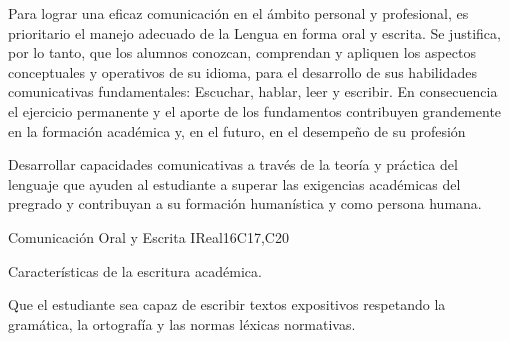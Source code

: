 \begin{syllabus}


\begin{justification}
Para lograr una eficaz comunicación en el ámbito personal y profesional, es prioritario el manejo adecuado de la Lengua en forma oral y escrita. Se justifica, por lo tanto, que los alumnos  conozcan, comprendan y apliquen los aspectos conceptuales y operativos de su idioma, para el desarrollo de sus habilidades comunicativas fundamentales: Escuchar, hablar, leer y escribir.
En consecuencia el ejercicio permanente y el aporte de los fundamentos contribuyen grandemente en la formación académica y, en el futuro, en el desempeño de su profesión
\end{justification}

\begin{goals}
\item Desarrollar capacidades comunicativas a través de la teoría y práctica del lenguaje que ayuden al estudiante a superar las exigencias académicas del pregrado y contribuyan a su formación humanística y como persona humana.
\end{goals}

\begin{outcomes}
   \item {}
   \item {}
   \item {}
\end{outcomes}

\begin{competences}
    \item {}
    \item {}
    \item {}
\end{competences}

\begin{unit}{Comunicación Oral y Escrita I}{}{Real}{16}{C17,C20}
  \begin{topics}
      \item Características de la escritura académica.
  \end{topics}

  \begin{learningoutcomes}
   \item Que el  estudiante sea capaz de escribir textos expositivos respetando la gramática, la ortografía y las normas léxicas normativas.
  \end{learningoutcomes}
\end{unit}


\end{syllabus}
